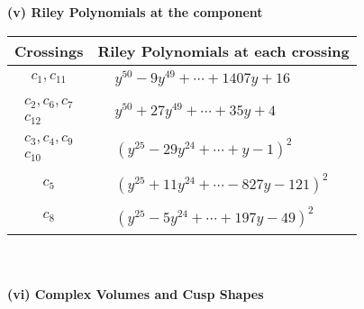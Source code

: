 \documentclass[1p]{elsarticle_modified}
\theoremstyle{definition}
\begin{document}
\newpage\renewcommand{\arraystretch}{1}
\flushleft \textbf{(v) Riley Polynomials at the component}\newline \\
\begin{tabular}{m{50pt}|m{274pt}}
Crossings & \hspace{64pt}Riley Polynomials at each crossing \\
\hline $$\begin{aligned}c_{1},c_{11}\end{aligned}$$&$\begin{aligned}
&y^{50}-9 y^{49}+\cdots+1407 y+16
\end{aligned}$\\
\hline $$\begin{aligned}c_{2},c_{6},c_{7}\\c_{12}\end{aligned}$$&$\begin{aligned}
&y^{50}+27 y^{49}+\cdots+35 y+4
\end{aligned}$\\
\hline $$\begin{aligned}c_{3},c_{4},c_{9}\\c_{10}\end{aligned}$$&$\begin{aligned}
&(y^{25}-29 y^{24}+\cdots+y-1)^{2}
\end{aligned}$\\
\hline $$\begin{aligned}c_{5}\end{aligned}$$&$\begin{aligned}
&(y^{25}+11 y^{24}+\cdots-827 y-121)^{2}
\end{aligned}$\\
\hline $$\begin{aligned}c_{8}\end{aligned}$$&$\begin{aligned}
&(y^{25}-5 y^{24}+\cdots+197 y-49)^{2}
\end{aligned}$\\
\hline
\end{tabular}\\~\\
\newpage\flushleft \textbf{(vi) Complex Volumes and Cusp Shapes}
\end{document}
